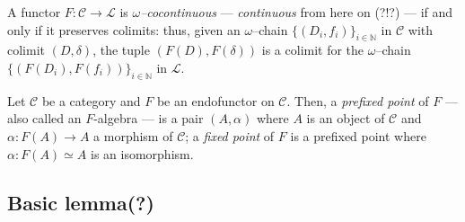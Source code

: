 \begin{dfn}
  A functor \(F \colon \mathcal{C} \to \mathcal{L}\) is \emph{\(\omega\)--cocontinuous} --- \emph{continuous} from here on (?!?) --- if and only if it preserves colimits: thus, given an \(\omega\)--chain
  \(\lbrace (D_i,f_i) \rbrace_{i \in \mathbb{N}}\) in \(\mathcal{C}\) with colimit \((D,\delta)\), the tuple \((F(D),F(\delta))\) is a colimit for the \(\omega\)--chain \(\lbrace (F(D_i),F(f_i)) \rbrace_{i \in \mathbb{N}}\) in \(\mathcal{L}\).
\end{dfn}

\begin{dfn}
  Let \(\mathcal{C}\) be a category and \(F\) be an endofunctor on \(\mathcal{C}\).
  Then, a \emph{prefixed point} of \(F\) --- also called an \(F\)-algebra --- is a pair \((A,\alpha)\) where \(A\) is an object of \(\mathcal{C}\) and \(\alpha \colon F(A) \to A\) a morphism of \(\mathcal{C}\); a \emph{fixed point} of \(F\) is a prefixed point where \(\alpha \colon F(A) \simeq A\) is an isomorphism.
\end{dfn}

\subsection{Basic lemma(?)}

